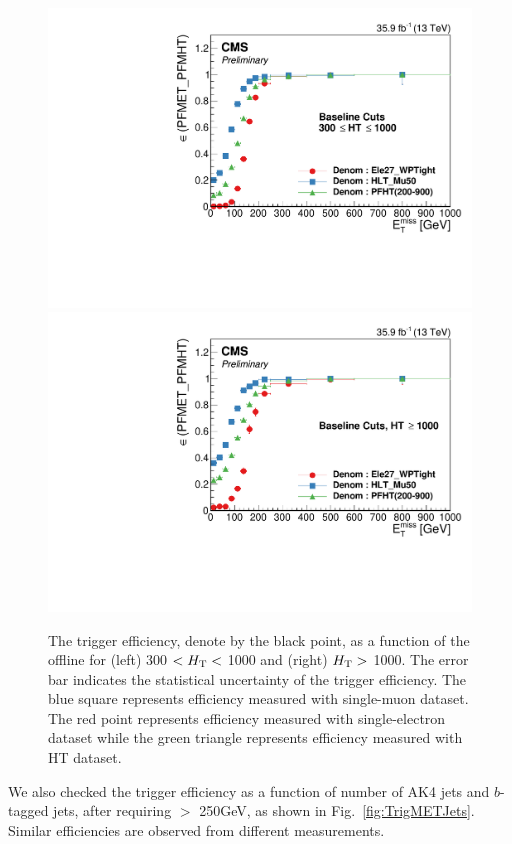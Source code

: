 \begin{figure}[tbp]
 \begin{center}
   \includegraphics[width=0.49\linewidth]{sections/mc4/EvtSelSBOpt/figures/TrigMET_HTLess1000.pdf}
   \includegraphics[width=0.49\linewidth]{sections/mc4/EvtSelSBOpt/figures/TrigMET_HTMore1000.pdf}
   \caption{ The trigger efficiency, denote by the black point, as a function
   of the offline \MET for (left) 300 $< H_{\mathrm{T}} <$ 1000 and (right) $H_{\mathrm{T}} >$ 1000.
   The error bar indicates the statistical uncertainty of the trigger
   efficiency. The blue square represents efficiency measured with
   single-muon dataset.  The red point represents efficiency measured
   with single-electron dataset while the green triangle represents
   efficiency measured with HT dataset.}
   \label{fig:TrigMETSys}
 \end{center}
\end{figure}

We also checked the trigger efficiency as a function of number of AK4 jets and
$b$-tagged jets, after requiring \MET $>$ 250GeV, as shown in
Fig.~\ref{fig:TrigMETJets}. Similar efficiencies are observed from different
measurements.

